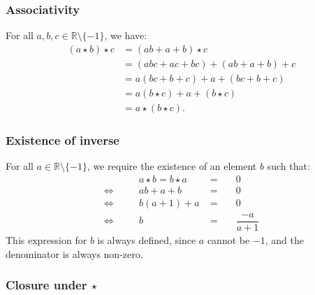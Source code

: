 \documentclass[11pt]{article}
\newcommand{\R}{\mathbb{R}}
\theoremstyle{definition}
\theoremstyle{plain}
\theoremstyle{remark}
\begin{document}
\begin{enumerate}
          \subsubsection*{Associativity}

          For all \(a, b, c \in \R \setminus \{-1\}\), we have:
          \[
              \begin{aligned}
                  (a \star b) \star c & = (ab + a + b) \star c               \\
                                      & = (abc + ac + bc) + (ab + a + b) + c \\
                                      & = a (bc + b + c) + a + (bc + b + c)  \\
                                      & = a (b \star c) + a + (b \star c)    \\
                                      & = a \star (b \star c).
              \end{aligned}
          \]

          \subsubsection*{Existence of inverse}

          For all \(a \in \R \setminus \{-1\}\), we require the existence of an element \(b\) such that:
          \[
              \begin{alignedat}{3}
                            &  & a \star b = b \star a & \; =\; &  & 0                 \\
                  \iff\quad &  & ab + a + b            & \; =\; &  & 0                 \\
                  \iff\quad &  & b(a + 1) + a          & \; =\; &  & 0                 \\
                  \iff\quad &  & b                     & \; =\; &  & \dfrac{-a}{a + 1}
              \end{alignedat}
          \]
          This expression for \(b\) is always defined, since \(a\) cannot be \(-1\), and the denominator is always non-zero.

          \subsubsection*{Closure under \(\star\)}


\end{enumerate}
\end{document}
